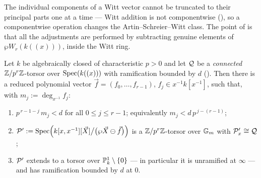 \begin{rem*}
    The individual components of a Witt vector cannot be truncated to their principal
    parts one at a time --- Witt addition is not componentwise
    (), so a componentwise operation changes the
    Artin--Schreier--Witt class. The point of
     is that all the adjustments are
    performed by subtracting genuine elements of $\wp W_r(k((x)))$, inside the Witt
    ring.
\end{rem*}

\begin{lemma}\label{lemma:realization_over_Gm_Wr:reorg}
    Let $k$ be algebraically closed of characteristic $p>0$ and let $\mathcal{Q}$ be a
    \emph{connected} $\mathbb{Z}/p^r\mathbb{Z}$-torsor over $\operatorname{Spec}(k((x)))$ with ramification bounded
    by $d$ (). Then there is a reduced
    polynomial vector $\vec f = (f_0, \dots, f_{r-1})$, $f_j \in x^{-1}k[x^{-1}]$,
    such that, with $m_j := \deg_{x^{-1}} f_j$:
    \begin{enumerate}
        \item \label{item:realization_Wr_polebound:reorg} $p^{\,r-1-j}\, m_j < d$ for all
        $0 \leq j \leq r-1$; equivalently $m_j < d\, p^{\,j-(r-1)}$;
        \item \label{item:realization_Wr_torsor:reorg}
        $\mathcal{P}' := \operatorname{Spec}\Bigl(k[x,x^{-1}][\vec X]\big/\bigl(\wp \vec X \ominus \vec f\bigr)\Bigr)$
        is a $\mathbb{Z}/p^r\mathbb{Z}$-torsor over $\mathbb{G}_m$ with $\mathcal{P}'_x \cong \mathcal{Q}$;
        \item \label{item:realization_Wr_infty:reorg} $\mathcal{P}'$ extends to a torsor over
        $\mathbb{P}^1_k \setminus \{0\}$ --- in particular it is unramified at $\infty$ ---
        and has ramification bounded by $d$ at $0$.
    \end{enumerate}
\end{lemma}

